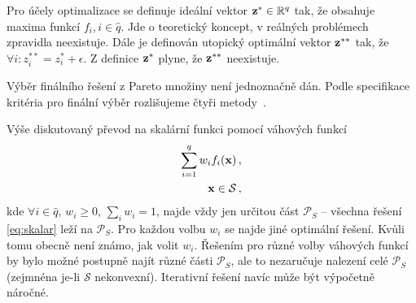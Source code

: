 Pro účely optimalizace se definuje ideální vektor $\mathbf{z}^{\ast} \in\mathbb{R}^q$ tak, že obsahuje maxima funkcí $f_i, i\in\hat{q}$. 
Jde o teoretický koncept, v reálných problémech zpravidla neexistuje. Dále je definován utopický optimální vektor $\mathbf{z}^{\ast\ast}$ 
tak, že $\forall i: z_{i}^{\ast\ast} = z_{i}^{\ast} + \epsilon$. Z definice $\mathbf{z}^{\ast}$ plyne, že $\mathbf{z}^{\ast\ast}$ neexistuje. 


Výběr finálního řešení z Pareto množiny není jednoznačně dán. Podle specifikace kritéria pro finální výběr rozlišujeme čtyři metody~\cite{schlunz}.

Výše diskutovaný převod na skalární funkci pomocí váhových funkcí 
\begin{align}
	\sum_{i=1}^q w_i f_i(\mathbf{x})\,,\label{eq:skalar}\\
	\mathbf{x} \in\mathcal{S}\,,
\end{align}
kde $\forall i\in\hat{q}$, $w_i \geq0$, $\sum_i w_i = 1$, najde vždy jen určitou část $\mathcal{P}_S$ -- všechna řešení \eqref{eq:skalar} leží na $\mathcal{P}_S$. 
Pro každou volbu $w_i$ se najde jiné 
optimální řešení. Kvůli tomu obecně není známo, jak volit $w_i$. Řešením pro různé volby váhových funkcí  
by bylo možné postupně najít různé části $\mathcal{P}_S$, ale to nezaručuje nalezení celé $\mathcal{P}_S$ (zejmnéna je-li $\mathcal{S}$ 
nekonvexní). Iterativní řešení navíc může být výpočetně náročné. 

